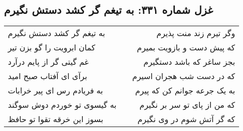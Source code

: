 \begin{center}
\section*{غزل شماره ۳۳۱: به تیغم گر کشد دستش نگیرم}
\label{sec:sh331}
\begin{longtable}{l p{0.5cm} r}
به تیغم گر کشد دستش نگیرم
&&
وگر تیرم زند منت پذیرم
\\
کمان ابرویت را گو بزن تیر
&&
که پیش دست و بازویت بمیرم
\\
غم گیتی گر از پایم درآرد
&&
بجز ساغر که باشد دستگیرم
\\
برآی ای آفتاب صبح امید
&&
که در دست شب هجران اسیرم
\\
به فریادم رس ای پیر خرابات
&&
به یک جرعه جوانم کن که پیرم
\\
به گیسوی تو خوردم دوش سوگند
&&
که من از پای تو سر بر نگیرم
\\
بسوز این خرقه تقوا تو حافظ
&&
که گر آتش شوم در وی نگیرم
\\
\end{longtable}
\end{center}
